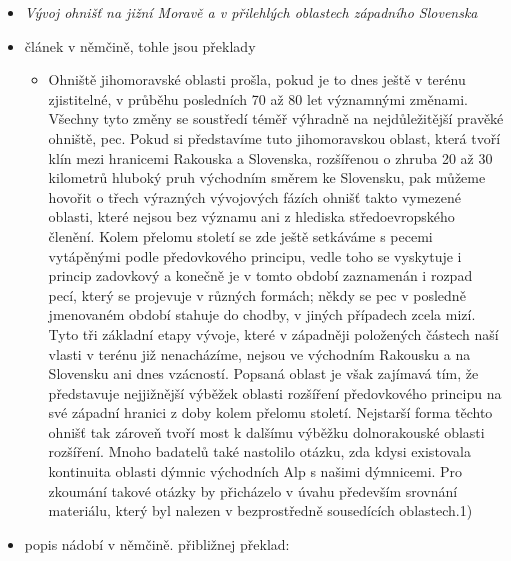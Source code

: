 \begin{itemize}
  \begin{itemize}
  \tightlist
  \item
     \emph{Vývoj ohnišť na jižní Moravě a v
    přilehlých oblastech západního Slovenska}
  \item
    článek v němčině, tohle jsou překlady

    \begin{itemize}
    \tightlist
    \item
      Ohniště jihomoravské oblasti prošla, pokud je to dnes ještě v
      terénu zjistitelné, v průběhu posledních 70 až 80 let významnými
      změnami. Všechny tyto změny se soustředí téměř výhradně na
      nejdůležitější pravěké ohniště, pec. Pokud si představíme tuto
      jihomoravskou oblast, která tvoří klín mezi hranicemi Rakouska a
      Slovenska, rozšířenou o zhruba 20 až 30 kilometrů hluboký pruh
      východním směrem ke Slovensku, pak můžeme hovořit o třech
      výrazných vývojových fázích ohnišť takto vymezené oblasti, které
      nejsou bez významu ani z hlediska středoevropského členění. Kolem
      přelomu století se zde ještě setkáváme s pecemi vytápěnými podle
      předovkového principu, vedle toho se vyskytuje i princip zadovkový
      a konečně je v tomto období zaznamenán i rozpad pecí, který se
      projevuje v různých formách; někdy se pec v posledně jmenovaném
      období stahuje do chodby, v jiných případech zcela mizí. Tyto tři
      základní etapy vývoje, které v západněji položených částech naší
      vlasti v terénu již nenacházíme, nejsou ve východním Rakousku a na
      Slovensku ani dnes vzácností. Popsaná oblast je však zajímavá tím,
      že představuje nejjižnější výběžek oblasti rozšíření předovkového
      principu na své západní hranici z doby kolem přelomu století.
      Nejstarší forma těchto ohnišť tak zároveň tvoří most k dalšímu
      výběžku dolnorakouské oblasti rozšíření. Mnoho badatelů také
      nastolilo otázku, zda kdysi existovala kontinuita oblasti dýmnic
      východních Alp s našimi dýmnicemi. Pro zkoumání takové otázky by
      přicházelo v úvahu především srovnání materiálu, který byl nalezen
      v bezprostředně sousedících oblastech.1)
    \end{itemize}
  \item
    popis nádobí v němčině. přibližnej překlad:


\end{itemize}
\end{itemize}
